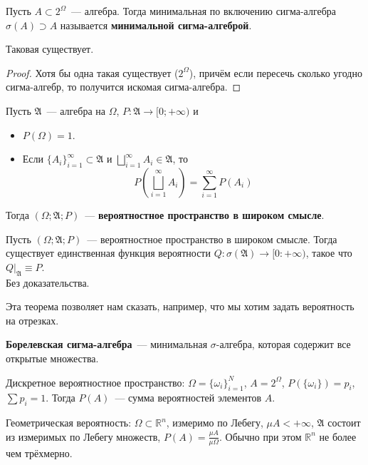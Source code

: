 \documentclass{article}
\newcommand{\A}{{\mathfrak A}}
\begin{document}
    \begin{definition}
        Пусть $A\subset2^\Omega$~--- алгебра. Тогда минимальная по включению сигма-алгебра $\sigma(A)\supset A$ называется \textbf{минимальной сигма-алгеброй}.
    \end{definition}
    \begin{claim}
        Таковая существует.
    \end{claim}
    \begin{proof}
        Хотя бы одна такая существует ($2^\Omega$), причём если пересечь сколько угодно сигма-алгебр, то получится искомая сигма-алгебра.
    \end{proof}
    \begin{definition}
        Пусть $\A$~--- алгебра на $\Omega$, $P\colon\A\to[0;+\infty)$ и
        \begin{itemize}
            \item $P(\Omega)=1$.
            \item Если $\{A_i\}_{i=1}^\infty\subset\A$ и $\bigsqcup\limits_{i=1}^\infty A_i\in\A$, то
            $$
            P\left(\bigsqcup\limits_{i=1}^\infty A_i\right)=\sum\limits_{i=1}^\infty P(A_i)
            $$
        \end{itemize}
        Тогда $(\Omega;\A;P)$~--- \textbf{вероятностное пространство в широком смысле}.
    \end{definition}
    \begin{theorem}
        Пусть $(\Omega;\A;P)$~--- вероятностное пространство в широком смысле. Тогда существует единственная функция вероятности $Q\colon\sigma(\A)\to[0:+\infty)$, такое что $Q\Big|_{\A}\equiv P$.\\
        Без доказательства.
    \end{theorem}
    \begin{remark}
        Эта теорема позволяет нам сказать, например, что мы хотим задать вероятность на отрезках.
    \end{remark}
    \begin{definition}
        \textbf{Борелевская сигма-алгебра}~--- минимальная $\sigma$-алгебра, которая содержит все открытые множества.
    \end{definition}
    \begin{example}
        Дискретное вероятностное пространство: $\Omega=\{\omega_i\}_{i=1}^N$, $A=2^\Omega$, $P(\{\omega_i\})=p_i$, $\sum p_i=1$. Тогда $P(A)$~--- сумма вероятностей элементов $A$.
    \end{example}
    \begin{example}
        Геометрическая вероятность: $\Omega\subset\mathbb R^n$, измеримо по Лебегу, $\mu A<+\infty$, $\A$ состоит из измеримых по Лебегу множеств, $P(A)=\frac{\mu A}{\mu\Omega}$. Обычно при этом $\mathbb R^n$ не более чем трёхмерно.
    \end{example}
\end{document}
